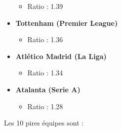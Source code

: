 \documentclass[
]{article}
\providecommand{\tightlist}{%
  \setlength{\itemsep}{0pt}\setlength{\parskip}{0pt}}
\begin{document}
\begin{itemize}
  \begin{itemize}
  \tightlist
  \item
    Ratio : 1.39
  \end{itemize}
\item
  \textbf{Tottenham (Premier League)}

  \begin{itemize}
  \tightlist
  \item
    Ratio : 1.36
  \end{itemize}
\item
  \textbf{Atlético Madrid (La Liga)}

  \begin{itemize}
  \tightlist
  \item
    Ratio : 1.34
  \end{itemize}
\item
  \textbf{Atalanta (Serie A)}

  \begin{itemize}
  \tightlist
  \item
    Ratio : 1.28
  \end{itemize}
\end{itemize}

Les 10 pires équipes sont :
\end{document}

